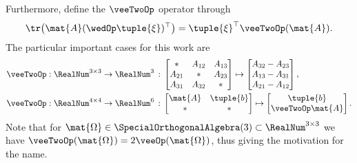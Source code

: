 Furthermore, define the $\veeTwoOp$ operator through
\begin{align}\label{eq:AppEqVeeTwo}
 \tr\big( \mat{A} (\wedOp\tuple{\xi})^\top \big) = \tuple{\xi}^\top \veeTwoOp(\mat{A}).
\end{align}
The particular important cases for this work are
\begin{subequations}\label{eq:AppDefVeeTwo}
\begin{align}
 \veeTwoOp &: \RealNum^{3\times 3} \rightarrow \RealNum^3 \, : \, \begin{bmatrix} \ast & A_{12} & A_{13} \\ A_{21} & \ast & A_{23} \\ A_{31} & A_{32} & \ast \end{bmatrix} \mapsto \begin{bmatrix} A_{32} - A_{23} \\ A_{13} - A_{31} \\ A_{21} - A_{12} \end{bmatrix},
\\
 \veeTwoOp &: \RealNum^{4\times 4} \rightarrow \RealNum^6 \, : \, \begin{bmatrix} \mat{A} & \tuple{b} \\ \ast & \ast \end{bmatrix} \mapsto \begin{bmatrix} \tuple{b} \\ \veeTwoOp\mat{A} \end{bmatrix}.
\end{align}
\end{subequations}
Note that for $\mat{\Omega} \in \SpecialOrthogonalAlgebra(3) \subset \RealNum^{3\times3}$ we have $\veeTwoOp(\mat{\Omega}) = 2 \veeOp(\mat{\Omega})$, thus giving the motivation for the name.

